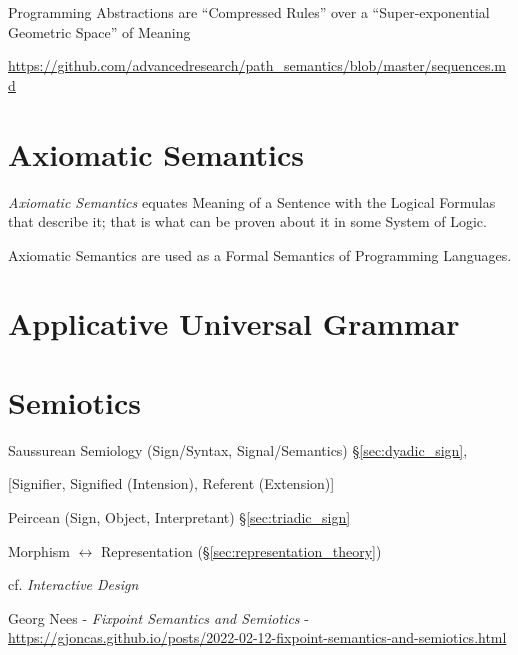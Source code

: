 Programming Abstractions are ``Compressed Rules'' over a
``Super-exponential Geometric Space'' of Meaning

\url{https://github.com/advancedresearch/path_semantics/blob/master/sequences.md}



\section{Axiomatic Semantics}\label{sec:axiomatic_semantics}

\emph{Axiomatic Semantics} equates Meaning of a Sentence with the
Logical Formulas that describe it; that is what can be proven about it
in some System of Logic.

Axiomatic Semantics are used as a Formal Semantics of Programming
Languages.



\section{Applicative Universal Grammar}
\label{sec:applicative_universal_grammar}

\section{Semiotics}\label{sec:semiotics}

Saussurean Semiology (Sign/Syntax, Signal/Semantics)
\S\ref{sec:dyadic_sign},

[Signifier, Signified (Intension), Referent (Extension)]

Peircean (Sign, Object, Interpretant) \S\ref{sec:triadic_sign}

Morphism $\leftrightarrow$ Representation (\S\ref{sec:representation_theory})

cf. \emph{Interactive Design}

Georg Nees - \emph{Fixpoint Semantics and Semiotics} -
\url{https://gjoncas.github.io/posts/2022-02-12-fixpoint-semantics-and-semiotics.html}

